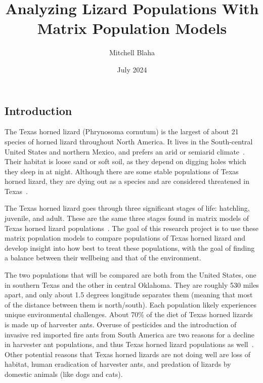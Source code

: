 \documentclass{article}
\title{Analyzing Lizard Populations With Matrix Population Models}
\author{Mitchell Blaha}
\date{July 2024}
\begin{document}
    \maketitle
    \tableofcontents

    \newpage
    \begin{center}
        \section{Introduction}\label{sec:introduction}
    \end{center}

    The Texas horned lizard (Phrynosoma cornutum) is the largest of about 21 species of horned lizard throughout North America.
    It lives in the South-central United States and northern Mexico, and prefers an arid or semiarid climate~\cite{walker_phrynosoma_2018}.
    Their habitat is loose sand or soft soil, as they depend on digging holes which they sleep in at night.
    Although there are some stable populations of Texas horned lizard, they are dying out as a species and are considered threatened in Texas~\cite{noauthor_texas_nodate}.

    The Texas horned lizard goes through three significant stages of life: hatchling, juvenile, and adult.
    These are the same three stages found in matrix models of Texas horned lizard populations~\cite{noauthor_nodate}.
    The goal of this research project is to use these matrix population models to compare populations of Texas horned lizard and develop insight into how best to treat these populations, with the goal of finding a balance between their wellbeing and that of the environment.

    The two populations that will be compared are both from the United States, one in southern Texas and the other in central Oklahoma.
    They are roughly 530 miles apart, and only about 1.5 degrees longitude separates them (meaning that most of the distance between them is north/south).
    Each population likely experiences unique environmental challenges.
    About 70\% of the diet of Texas horned lizards is made up of harvester ants.
    Overuse of pesticides and the introduction of invasive red imported fire ants from South America are two reasons for a decline in harvester ant populations, and thus Texas horned lizard populations as well~\cite{fertschai_avoiding_2021}.
    Other potential reasons that Texas horned lizards are not doing well are loss of habitat, human eradication of harvester ants, and predation of lizards by domestic animals (like dogs and cats).
\end{document}
